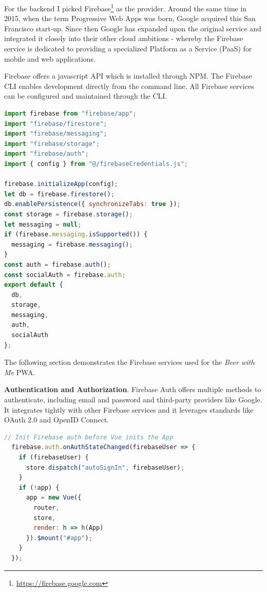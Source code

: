 For the backend I picked Firebase\footnote{\url{https://firebase.google.com}} as the provider. Around the same time in 2015, when the term Progressive Web Apps was born, Google acquired this San Francisco start-up. Since then Google has expanded upon the original service and integrated it closely into their other cloud ambitions - whereby the Firebase service is dedicated to providing a specialized Platform as a Service (PaaS) for mobile and web applications.

Firebase offers a javascript API which is installed through NPM. The Firebase CLI enables development directly from the command line. All Firebase services can be configured and maintained through the CLI.

\begin{lstlisting}[language=JavaScript, caption=Firebase configuration and services (firebaseConfig.js), label=lst:firebase-conf]
import firebase from "firebase/app";
import "firebase/firestore";
import "firebase/messaging";
import "firebase/storage";
import "firebase/auth";
import { config } from "@/firebaseCredentials.js";

firebase.initializeApp(config);
let db = firebase.firestore();
db.enablePersistence({ synchronizeTabs: true });
const storage = firebase.storage();
let messaging = null;
if (firebase.messaging.isSupported()) {
  messaging = firebase.messaging();
}
const auth = firebase.auth();
const socialAuth = firebase.auth;
export default {
  db,
  storage,
  messaging,
  auth,
  socialAuth
};
\end{lstlisting}


The following section demonstrates the Firebase services used for the \textit{Beer with Me} PWA.

\textbf{Authentication and Authorization}. Firebase Auth offers multiple methods to authenticate, including email and password and third-party providers like Google. It integrates tightly with other Firebase services and it leverages standards like OAuth 2.0 and OpenID Connect.

\begin{lstlisting}[language=JavaScript, caption=Firebase Auth initiation using VueJS (main.js), label=lst:firebase-auth]
  // Init Firebase auth before Vue inits the App
  firebase.auth.onAuthStateChanged(firebaseUser => {
    if (firebaseUser) {
      store.dispatch("autoSignIn", firebaseUser);
    }
    if (!app) {
      app = new Vue({
        router,
        store,
        render: h => h(App)
      }).$mount("#app");
    }
  });
\end{lstlisting}

